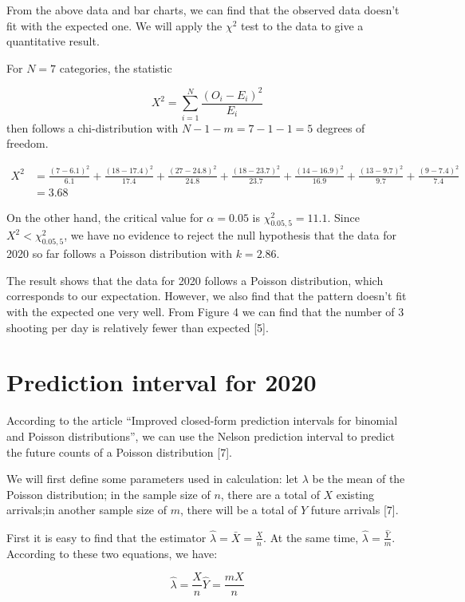 \documentclass[a4paper]{article}
\begin{document}
    From the above data and bar charts, we can find that the observed data doesn't fit with the expected one. We will apply the $\chi^2$ test to the data to give a quantitative result.
    
    For $N=7$ categories, the statistic
    
    $$X^2=\sum\limits_{i=1}^N\frac{(O_i-E_i)^2}{E_i}$$
    then follows a chi-distribution with $N-1-m=7-1-1=5$ degrees of freedom.
    
    \begin{align*}
    X^2&=\frac{(7-6.1)^2}{6.1}+\frac{(18-17.4)^2}{17.4}+\frac{(27-24.8)^2}{24.8}+\frac{(18-23.7)^2}{23.7}+\frac{(14-16.9)^2}{16.9}+\frac{(13-9.7)^2}{9.7}+\frac{(9-7.4)^2}{7.4}\\
    &=3.68
    \end{align*}
    
	On the other hand, the critical value for $\alpha=0.05$ is $\chi^2_{0.05,5}=11.1$. Since $X^2<\chi^2_{0.05,5}$, we have no evidence to reject the null hypothesis that the data for 2020 so far follows a Poisson distribution with $k=2.86$.
	
	The result shows that the data for 2020 follows a Poisson distribution, which corresponds to our expectation. However, we also find that the pattern doesn't fit with the expected one very well. From Figure 4 we can find that the number of 3 shooting per day is relatively fewer than expected [5].

\section{Prediction interval for 2020}
	According to the article “Improved closed-form prediction intervals for binomial and Poisson distributions”, we can use the Nelson prediction interval to predict the future counts of a Poisson distribution [7].
	
	We will first define some parameters used in calculation: let $\lambda$ be the mean of the Poisson distribution; in the sample size of $n$, there are a total of $X$ existing arrivals;in another sample size of $m$, there will be a total of $Y$ future arrivals [7].
	
	First it is easy to find that the estimator $\hat{\lambda}=\bar{X}=\frac{X}{n}$. At the same time, $\hat{\lambda}=\frac{\hat{Y}}{m}$. According to these two equations, we have:
	
	\begin{equation}
	\hat{\lambda}=\frac{X}{n}
	\hat{Y}=\frac{mX}{n}
	\end{equation}
\end{document}
